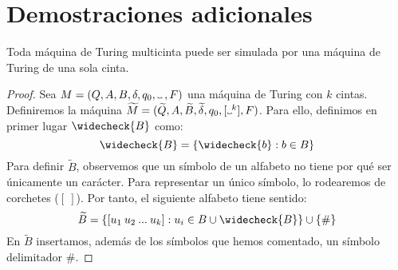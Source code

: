 
\chapter{Demostraciones adicionales}\label{ap:demostraciones-adicionales}

\begin{proposicion}\label{prop:ap-mtm}
Toda máquina de Turing multicinta puede ser simulada por una máquina de Turing de una sola cinta.
\end{proposicion}
\begin{proof}
Sea $M=(Q, A, B, \delta, q_0, \Vtextvisiblespace\:, F)$ una máquina de Turing con $k$ cintas. Definiremos la máquina $\widetilde{M}=(\widetilde{Q}, A, \widetilde{B}, \widetilde{\delta}, q_0, [\Vtextvisiblespace^k], F)$. Para ello, definimos en primer lugar $\widecheck{B}$ como:
$$
    \widecheck{B} = \{\widecheck{b} : b \in B\}
$$
Para definir $\widetilde{B}$, observemos que un símbolo de un alfabeto no tiene por qué ser únicamente un carácter. Para representar un único símbolo, lo rodearemos de corchetes ($[\:]$). Por tanto, el siguiente alfabeto tiene sentido:
$$
    \widetilde{B} = \{[u_1\:u_2\:...\:u_k]:u_i\in B\cup\widecheck{B}\}\cup\{\#\}
$$
En $\widetilde{B}$ insertamos, además de los símbolos que hemos comentado, un símbolo delimitador $\#$.


\end{proof}
